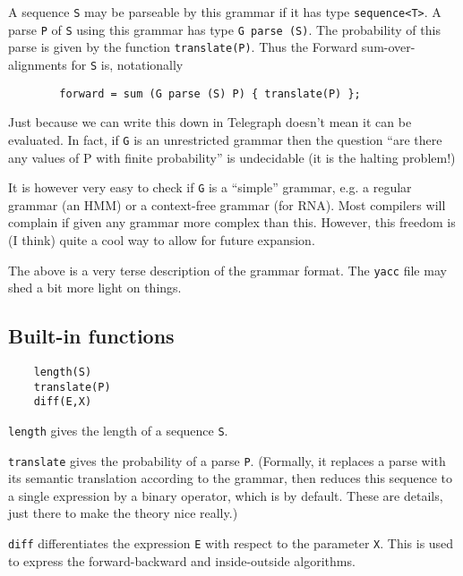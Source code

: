 \documentclass{article}
\begin{document}
A sequence {\tt S} may be parseable by this grammar if it has type
{\tt sequence<T>}. A parse {\tt P} of {\tt S} using this grammar has type {\tt G parse (S)}.
The probability of this parse is given by the function {\tt translate(P)}.
Thus the Forward sum-over-alignments for {\tt S} is, notationally

\begin{verbatim}
		forward = sum (G parse (S) P) { translate(P) };
\end{verbatim}

Just because we can write this down in Telegraph doesn't mean it can be
evaluated. In fact, if {\tt G} is an unrestricted grammar then the question ``are
there any values of P with finite probability'' is undecidable (it is the
halting problem!)

It is however very easy to check if {\tt G} is a ``simple'' grammar, e.g. a
regular grammar (an HMM) or a context-free grammar (for RNA). Most
compilers will complain if given any grammar more complex than this.
However, this freedom is (I think) quite a cool way to allow for future
expansion.

The above is a very terse description of the grammar format. The {\tt yacc}
file may shed a bit more light on things.


\subsection{Built-in functions}

\begin{verbatim}
	length(S)
	translate(P)
	diff(E,X)
\end{verbatim}

{\tt length} gives the length of a sequence {\tt S}.

{\tt translate} gives the probability of a parse {\tt P}. (Formally, it replaces a
parse with its semantic translation according to the grammar, then reduces
this sequence to a single expression by a binary operator, which is {\tt *} by
default. These are details, just there to make the theory nice really.)

{\tt diff} differentiates the expression {\tt E} with respect to the parameter {\tt X}.
This is used to express the forward-backward and inside-outside
algorithms.



\end{document}
